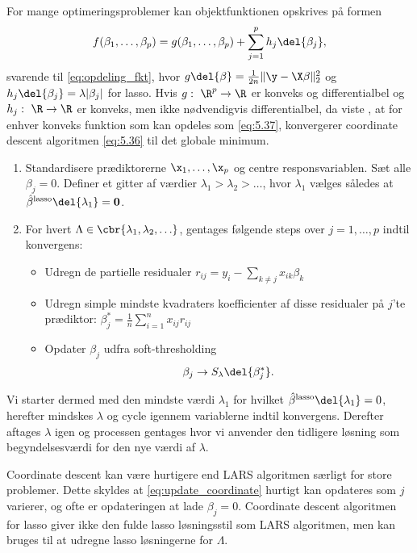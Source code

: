 For mange optimeringsproblemer kan objektfunktionen opskrives på formen
\begin{align}
f(\beta_1, \dots, \beta_p) = g(\beta_1, \dots, \beta_p) + \sum_{j = 1}^p h_j \del{\beta_j}, \label{eq:5.37}
\end{align}
svarende til \eqref{eq:opdeling_fkt}, hvor \(g \del{\beta} = \frac{1}{2n} \Vert \y - \X \beta \Vert_2^2\) og \(h_j \del{\beta_j} = \lambda \vert \beta_j \vert\) for lasso.
Hvis \(g: \ \R^p \rightarrow \R\) er konveks og differentialbel og $h_j: \ \R \rightarrow \R$ er konveks, men ikke nødvendigvis differentialbel, da viste \citep{Tseng_coordinate}, at for enhver konveks funktion som kan opdeles som \eqref{eq:5.37}, konvergerer coordinate descent algoritmen \eqref{eq:5.36} til det globale minimum. 
%
\begin{alg} 
\begin{enumerate}
\item Standardisere prædiktorerne \(\x_1, \ldots, \x_p\) og centre responsvariablen.
Sæt alle \(\beta_j = 0\).
Definer et gitter af værdier \(\lambda_1 > \lambda_2 > \ldots\), hvor \(\lambda_1\) vælges således at \(\hat{\beta}^\text{lasso} \del{\lambda_1} =\mathbf{0}\).
\item For hvert \(\Lambda \in \cbr{\lambda_1, \lambda_2, \ldots}\), gentages følgende steps over \(j = 1, \ldots, p\) indtil konvergens:
\begin{itemize}
\item Udregn de partielle residualer \(r_{ij} = y_i - \sum_{k \neq j} x_{ik} \beta_k\)
\item Udregn simple mindste kvadraters koefficienter af disse residualer på \(j\)'te prædiktor: \(\beta_j^* = \frac{1}{n} \sum_{i=1}^n x_{ij} r_{ij}\) 
\item Opdater \(\beta_j\) udfra soft-thresholding
\begin{align}
\beta_j \rightarrow S_\lambda \del{\beta_j^*}. \label{eq:update_coordinate}
\end{align}
\end{itemize}
\end{enumerate}
\end{alg}
%
Vi starter dermed med den mindste værdi \(\lambda_1\) for hvilket \(\hat{\beta}^\text{lasso} \del{\lambda_1} = 0\), herefter mindskes \(\lambda\) og cycle igennem variablerne indtil konvergens.
Derefter aftages \(\lambda\) igen og processen gentages hvor vi anvender den tidligere løsning som begyndelsesværdi for den nye værdi af \(\lambda\).

Coordinate descent kan være hurtigere end LARS algoritmen særligt for store problemer.
Dette skyldes at \eqref{eq:update_coordinate} hurtigt kan opdateres som \(j\) varierer, og ofte er opdateringen at lade \(\beta_j = 0\).
Coordinate descent algoritmen for lasso giver ikke den fulde lasso løsningsstil som LARS algoritmen, men kan bruges til at udregne lasso løsningerne for \(\Lambda\).

\newpage